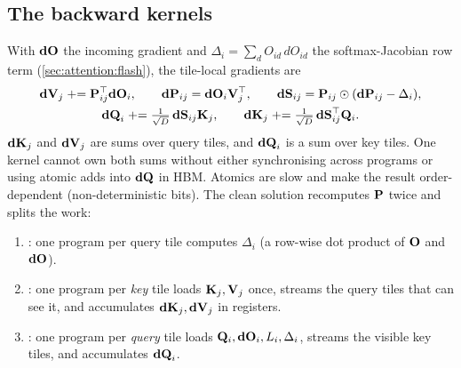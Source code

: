 \subsection{The backward kernels}

With $\mathbf{dO}$ the incoming gradient and $\Delta_i=\sum_d O_{id}\,dO_{id}$ the softmax-Jacobian
row term (\cref{sec:attention:flash}), the tile-local gradients are
\begin{gather}
\mathbf{dV}_j \mathrel{+}= \mathbf{P}_{ij}^{\top}\mathbf{dO}_i,\qquad
\mathbf{dP}_{ij}=\mathbf{dO}_i\mathbf{V}_j^{\top},\qquad
\mathbf{dS}_{ij}=\mathbf{P}_{ij}\odot(\mathbf{dP}_{ij}-\Delta_i),\nonumber\\
\mathbf{dQ}_i \mathrel{+}= \tfrac{1}{\sqrt D}\,\mathbf{dS}_{ij}\mathbf{K}_j,\qquad
\mathbf{dK}_j \mathrel{+}= \tfrac{1}{\sqrt D}\,\mathbf{dS}_{ij}^{\top}\mathbf{Q}_i .
\label{eq:perf:fa2bwd}
\end{gather}
$\mathbf{dK}_j$ and $\mathbf{dV}_j$ are sums over query tiles, and $\mathbf{dQ}_i$ is a sum over key tiles.
One kernel cannot own both sums without either synchronising across programs or using atomic
adds into $\mathbf{dQ}$ in HBM. Atomics are slow and make the result order-dependent (non-deterministic
bits). The clean solution recomputes $\mathbf{P}$ twice and splits the work:

\begin{enumerate}
\item {}: one program per query tile computes $\Delta_i$ (a row-wise dot
  product of $\mathbf{O}$ and $\mathbf{dO}$).
\item {}: one program per \emph{key} tile loads $\mathbf{K}_j,\mathbf{V}_j$ once,
  streams the query tiles that can see it, and accumulates $\mathbf{dK}_j,\mathbf{dV}_j$ in registers.
\item {}: one program per \emph{query} tile loads $\mathbf{Q}_i,\mathbf{dO}_i,L_i,\Delta_i$,
  streams the visible key tiles, and accumulates $\mathbf{dQ}_i$.
\end{enumerate}

